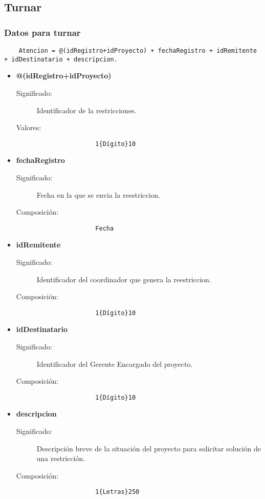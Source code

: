 \subsection{Turnar}\label{dd:Turnar}
\subsubsection{Datos para turnar}
\begin{lstlisting}
	Atencion = @(idRegistro+idProyecto) + fechaRegistro + idRemitente + idDestinatario + descripcion.
\end{lstlisting}
\begin{itemize}
	\item	\textbf{@(idRegistro+idProyecto)}
		\begin{description}
			\item [Significado:] Identificador de la restricciones.
			\item [Valores:]{\begin{lstlisting}
				1{Dígito}10\end{lstlisting}}
		\end{description}
	\item \textbf{fechaRegistro}
		\begin{description}
			\item [Significado:] Fecha en la que se envia la reestriccion.
			\item [Composición:]{\begin{lstlisting}
				Fecha\end{lstlisting}}
		\end{description}
	\item \textbf{idRemitente}
		\begin{description}
			\item [Significado:] Identificador del coordinador que genera la reestriccion.
			\item [Composición:]{\begin{lstlisting}
				1{Dígito}10\end{lstlisting}}
		\end{description}
	\item \textbf{idDestinatario}
		\begin{description}
			\item [Significado:] Identificador del Gerente Encargado del proyecto.
			\item [Composición:]{\begin{lstlisting}
				1{Dígito}10\end{lstlisting}}
		\end{description}
	\item \textbf{descripcion}
		\begin{description}
			\item [Significado:] Descripción breve de la situación del proyecto para solicitar solución de una restricción.
			\item [Composición:]{\begin{lstlisting}
				1{Letras}250\end{lstlisting}}
		\end{description}
\end{itemize}

